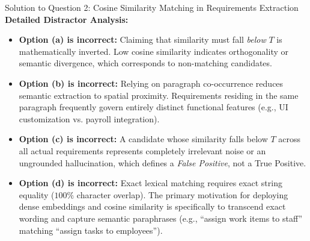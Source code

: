 \documentclass[11pt,a4paper]{article}
\begin{document}
\begin{solutionbox}{Solution to Question 2: Cosine Similarity Matching in Requirements Extraction}
\medskip
\textbf{Detailed Distractor Analysis:}
\begin{itemize}[leftmargin=1.8em]
    \item \textbf{Option (a) is incorrect:} Claiming that similarity must fall \textit{below} $T$ is mathematically inverted. Low cosine similarity indicates orthogonality or semantic divergence, which corresponds to non-matching candidates.
    \item \textbf{Option (b) is incorrect:} Relying on paragraph co-occurrence reduces semantic extraction to spatial proximity. Requirements residing in the same paragraph frequently govern entirely distinct functional features (e.g., UI customization vs. payroll integration).
    \item \textbf{Option (c) is incorrect:} A candidate whose similarity falls below $T$ across all actual requirements represents completely irrelevant noise or an ungrounded hallucination, which defines a \textit{False Positive}, not a True Positive.
    \item \textbf{Option (d) is incorrect:} Exact lexical matching requires exact string equality ($100\%$ character overlap). The primary motivation for deploying dense embeddings and cosine similarity is specifically to transcend exact wording and capture semantic paraphrases (e.g., ``assign work items to staff'' matching ``assign tasks to employees'').
\end{itemize}
\end{solutionbox}
\end{document}
